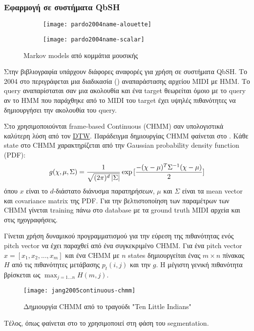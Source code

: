 \subsubsection{Εφαρμογή σε συστήματα QbSH}
\begin{figure}[htb]
	\centering
	\begin{subfigure}{0.45\linewidth}
		\texttt{[image: pardo2004name-alouette]}
	\end{subfigure}\hfill
	\begin{subfigure}{0.45\linewidth}
		\texttt{[image: pardo2004name-scalar]}
	\end{subfigure}
	\caption{Markov models από κομμάτια μουσικής \protect\cite{pardo2004name}}
	\label{fig:pardo2004name-alouette}
\end{figure}

Στην βιβλιογραφία υπάρχουν διάφορες αναφορές για χρήση \hmm{} σε συστήματα QbSH.
Το 2004 στο \cite{pardo2004name} περιγράφεται μια διαδικασία () αναπαράστασης αρχείου MIDI με HMM.
Το query αναπαρίσταται σαν μια ακολουθία και ένα target θεωρείται όμοιο με το query αν το HMM που παράχθηκε από το MIDI του target έχει υψηλές πιθανότητες να δημιουργήσει την ακολουθία του query.

Στο \cite{jang2005continuous} χρησιμοποιούνται frame-based Continuous \hmm{} (CHMM) σαν υπολογιστικά καλύτερη λύση από τον \hyperref[sub:DTW]{DTW}.
Παράδειγμα δημιουργίας CHMM φαίνεται στο .
Κάθε state στο CHMM χαρακτηρίζεται από την Gaussian probability density function (PDF):
\begin{equation*}
	g(\chi, \mu, \Sigma) = \frac{1}{\sqrt{(2\pi)^d\left\lvert\Sigma\right\rvert}} \exp{[\frac{-(\chi-\mu)^T\Sigma^{-1}(\chi-\mu)}{2}]}
\end{equation*}
όπου $x$ είναι το $d$-διάστατο διάνυσμα παρατηρήσεων, $\mu$ και $\Sigma$ είναι τα mean vector και covariance matrix της PDF.
Για την βελτιστοποίηση των παραμέτρων των CHMM γίνεται training πάνω στο database με τα ground truth MIDI αρχεία και στις ηχογραφήσεις.

Γίνεται χρήση δυναμικού προγραμματισμού για την εύρεση της πιθανότητας ενός pitch vector να έχει παραχθεί από ένα συγκεκριμένο CHMM.
Για ένα pitch vector $x = [x_1, x_2, ..., x_m]$ και ένα CHMM με $n$ states δημιουργείται ένας $m \times n$ πίνακας $H$ από τις πιθανότητες μετάβασης $p_t(i,j)$ και την $g$.
Η μέγιστη γενική πιθανότητα βρίσκεται ως $\max_{j=1...n}{H(m,j)}$.

\begin{figure}
	\centering
	\texttt{[image: jang2005continuous-chmm]}
	\caption{Δημιουργία CHMM από το τραγούδι "Ten Little Indians" \protect\cite{jang2005continuous}}
	\label{fig:jang2005continuous-chmm}
\end{figure}

Τέλος, όπως φαίνεται στο  το \cite{slaney2008locality} χρησιμοποιεί \hmm{} στη φάση του segmentation.

\undef{\hmm}
